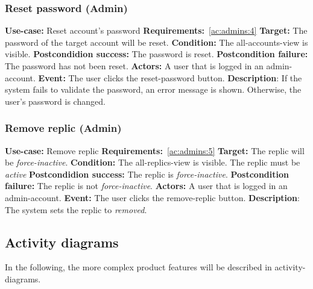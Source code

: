 \subsubsection{Reset password (Admin)}\label{subsubsec:reset-pass}
\textbf{Use-case:} Reset account's password \newline
\textbf{Requirements:}~\ref{ac:admins:4} \newline
\textbf{Target:} The password of the target account will be reset. \newline
\textbf{Condition:} The all-accounts-view is visible. \newline
\textbf{Postcondidion success:} The password is reset. \newline
\textbf{Postcondition failure:} The password has not been reset. \newline
\textbf{Actors:} A user that is logged in an admin-account. \newline
\textbf{Event:} The user clicks the reset-password button. \newline
\textbf{Description}: If the system fails to validate the password, an error message is shown.
Otherwise, the user's password is changed.

\subsubsection{Remove replic (Admin)}\label{subsubsec:remove-replic}
\textbf{Use-case:} Remove replic \newline
\textbf{Requirements:}~\ref{ac:admins:5} \newline
\textbf{Target:} The replic will be \textit{force-inactive}. \newline
\textbf{Condition:} The all-replics-view is visible.
The replic must be \textit{active} \newline
\textbf{Postcondidion success:} The replic is \textit{force-inactive}. \newline
\textbf{Postcondition failure:} The replic is not \textit{force-inactive}. \newline
\textbf{Actors:} A user that is logged in an admin-account. \newline
\textbf{Event:} The user clicks the remove-replic button. \newline
\textbf{Description}: The system sets the replic to \textit{removed}.

\subsection{Activity diagrams}\label{subsec:activity-diagrams}
In the following, the more complex product features will be described in activity-diagrams.


